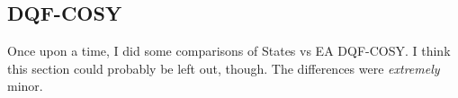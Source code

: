 \subsection{DQF-COSY}
\label{subsec:noah__dqfcosy}

Once upon a time, I did some comparisons of States vs EA DQF-COSY.
I think this section could probably be left out, though.
The differences were \textit{extremely} minor.
